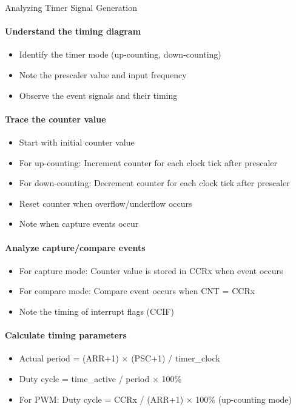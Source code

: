 \begin{KR}{Analyzing Timer Signal Generation}
\paragraph{Understand the timing diagram}
\begin{itemize}
    \item Identify the timer mode (up-counting, down-counting)
    \item Note the prescaler value and input frequency
    \item Observe the event signals and their timing
\end{itemize}

\paragraph{Trace the counter value}
\begin{itemize}
    \item Start with initial counter value
    \item For up-counting: Increment counter for each clock tick after prescaler
    \item For down-counting: Decrement counter for each clock tick after prescaler
    \item Reset counter when overflow/underflow occurs
    \item Note when capture events occur
\end{itemize}

\paragraph{Analyze capture/compare events}
\begin{itemize}
    \item For capture mode: Counter value is stored in CCRx when event occurs
    \item For compare mode: Compare event occurs when CNT = CCRx
    \item Note the timing of interrupt flags (CCIF)
\end{itemize}

\paragraph{Calculate timing parameters}
\begin{itemize}
    \item Actual period = (ARR+1) × (PSC+1) / timer\_clock
    \item Duty cycle = time\_active / period × 100\%
    \item For PWM: Duty cycle = CCRx / (ARR+1) × 100\% (up-counting mode)
\end{itemize}
\end{KR}

